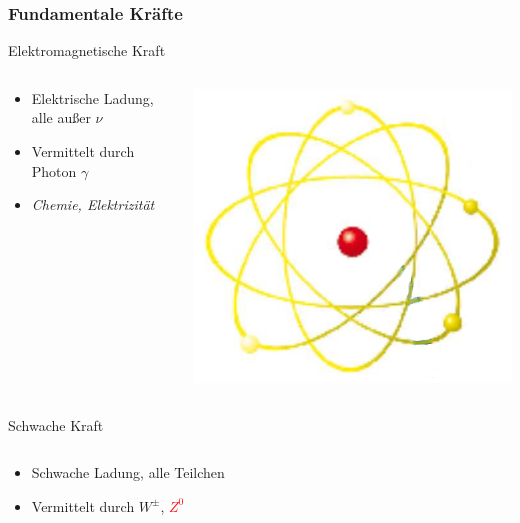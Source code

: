 \documentclass{beamer}
\newcommand{\znull}{\ensuremath{Z^{0}}\xspace}
\begin{document}
\begin{frame}
  \frametitle{Fundamentale Kr\"afte}
  \vskip-0.2cm
  \begin{block}{Elektromagnetische Kraft}
   \begin{columns}[T]
     \begin{column}{0.7\textwidth}
        \begin{itemize}
        \item Elektrische Ladung, alle au\ss{}er $\nu$
        \item Vermittelt durch Photon $\gamma$
        \item \textit{Chemie, Elektrizit\"at}
        \end{itemize}
      \end{column}
      \begin{column}{0.3\textwidth}
        \centering
        \vskip-0.3cm
        \includegraphics[height=0.22\textheight]{matter/Atom.png}
      \end{column}
    \end{columns}
  \end{block}
  \pause
  \begin{block}{Schwache Kraft}
    \begin{columns}[T]
      \begin{column}{0.7\textwidth}
        \begin{itemize}
        \item Schwache Ladung, alle Teilchen
        \item Vermittelt durch $W^{\pm}$, \textcolor{red}{$\znull$}

\end{itemize}
\end{column}
\end{columns}
\end{block}
\end{frame}
\end{document}

